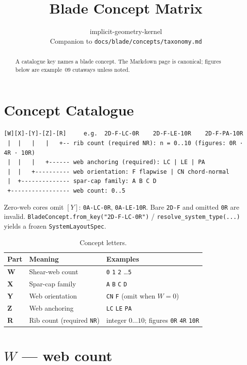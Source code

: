 \documentclass[11pt,a4paper]{article}
\title{Blade Concept Matrix}
\author{implicit-geometry-kernel\\
  \normalsize Companion to \texttt{docs/blade/concepts/taxonomy.md}}
\date{}
\newcommand{\tok}[1]{\texttt{#1}}
\newcommand{\code}[1]{\texttt{#1}}
\begin{document}
\maketitle
\thispagestyle{fancy}

\begin{abstract}
\noindent
A catalogue key names a blade concept. The Markdown page is canonical;
figures below are example~09 cutaways unless noted.
\end{abstract}

\section{Concept Catalogue}

\begin{verbatim}
[W][X]-[Y]-[Z]-[R]     e.g.  2D-F-LC-0R    2D-F-LE-10R    2D-F-PA-10R
 |  |   |   |   +-- rib count (required NR): n = 0..10 (figures: 0R · 4R · 10R)
 |  |   |   +------ web anchoring (required): LC | LE | PA
 |  |   +---------- web orientation: F flapwise | CN chord-normal
 |  +-------------- spar-cap family: A B C D
 +----------------- web count: 0..5
\end{verbatim}

Zero-web cores omit $[Y]$: \tok{0A-LC-0R}, \tok{0A-LE-10R}. Bare \tok{2D-F} and
omitted \tok{0R} are invalid.
\code{BladeConcept.from\_key("2D-F-LC-0R")} /
\code{resolve\_system\_type(...)} yields a frozen \code{SystemLayoutSpec}.

\begin{table}[H]
\centering
\caption{Concept letters.}
\label{tab:parts}
\begin{tabularx}{\textwidth}{@{}llX@{}}
\toprule
Part & Meaning & Examples \\
\midrule
\textbf{W} & Shear-web count & \tok{0} \tok{1} \tok{2} \ldots \tok{5} \\
\textbf{X} & Spar-cap family & \tok{A} \tok{B} \tok{C} \tok{D} \\
\textbf{Y} & Web orientation & \tok{CN} \tok{F} (omit when $W=0$) \\
\textbf{Z} & Web anchoring & \tok{LC} \tok{LE} \tok{PA} \\
\textbf{R} & Rib count (required \tok{NR})
  & integer $0\ldots 10$; figures \tok{0R} \tok{4R} \tok{10R} \\
\bottomrule
\end{tabularx}
\end{table}

\section{\texorpdfstring{$W$}{W} --- web count}
\label{sec:w}
\end{document}
